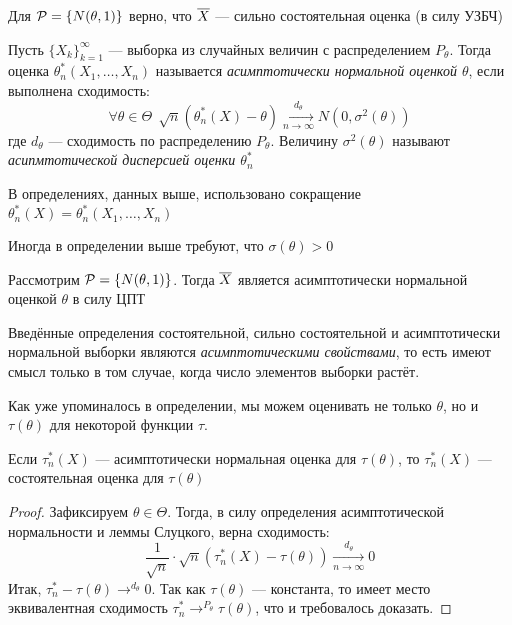 \begin{example}
	Для $\mathcal{P} = \{N(\theta, 1)\}$ верно, что $\overline{X}$ --- сильно состоятельная оценка (в силу УЗБЧ)
\end{example}

\begin{definition}
	Пусть $\{X_k\}_{k = 1}^\infty$ --- выборка из случайных величин с распределением $P_\theta$. Тогда оценка $\theta_n^*(X_1, \ldots, X_n)$ называется \textit{асимптотически нормальной оценкой $\theta$}, если выполнена сходимость:
	\[
		\forall \theta \in \Theta\ \ \sqrt{n}(\theta_n^*(X) - \theta) \xrightarrow[n \to \infty]{d_\theta} N(0, \sigma^2(\theta))
	\]
	где $d_\theta$ --- сходимость по распределению $P_\theta$. Величину $\sigma^2(\theta)$ называют \textit{асипмтотической дисперсией оценки $\theta_n^*$}
\end{definition}

\begin{anote}
	В определениях, данных выше, использовано сокращение $\theta_n^*(X) = \theta_n^*(X_1, \ldots, X_n)$
\end{anote}

\begin{note}
	Иногда в определении выше требуют, что $\sigma(\theta) > 0$
\end{note}

\begin{example}
	Рассмотрим $\mathcal{P} = \{N(\theta, 1)\}$. Тогда $\overline{X}$ является асимптотически нормальной оценкой $\theta$ в силу ЦПТ
\end{example}

\begin{note}
	Введённые определения состоятельной, сильно состоятельной и асимптотически нормальной выборки являются \textit{асимптотическими свойствами}, то есть имеют смысл только в том случае, когда число элементов выборки растёт.
\end{note}

\begin{note}
	Как уже упоминалось в определении, мы можем оценивать не только $\theta$, но и $\tau(\theta)$ для некоторой функции $\tau$.
\end{note}

\begin{proposition}
	Если $\tau_n^*(X)$ --- асимптотически нормальная оценка для $\tau(\theta)$, то $\tau_n^*(X)$ --- состоятельная оценка для $\tau(\theta)$
\end{proposition}

\begin{proof}
	Зафиксируем $\theta \in \Theta$. Тогда, в силу определения асимптотической нормальности и леммы Слуцкого, верна сходимость:
	\[
		\frac{1}{\sqrt{n}} \cdot \sqrt{n}(\tau_n^*(X) - \tau(\theta)) \xrightarrow[n \to \infty]{d_\theta} 0
	\]
	Итак, $\tau_n^* - \tau(\theta) \to^{d_\theta} 0$. Так как $\tau(\theta)$ --- константа, то имеет место эквивалентная сходимость $\tau_n^* \to^{P_\theta} \tau(\theta)$, что и требовалось доказать.
\end{proof}

